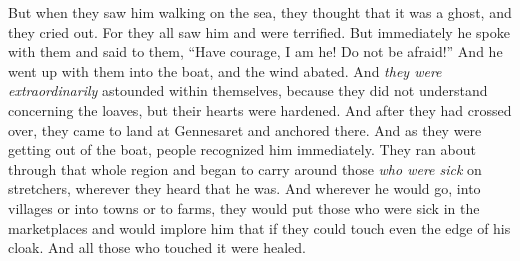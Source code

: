 \begin{biblechapter}
\verse But when they saw him walking on the sea, they thought that it was a ghost, and they cried out.
\verse For they all saw him and were terrified. But immediately he spoke with them and said to them, “Have courage, I am he! Do not be afraid!”
\verse And he went up with them into the boat, and the wind abated. And \textit{they were extraordinarily} astounded within themselves,
\verse because they did not understand concerning the loaves, but their hearts were hardened.
 And after they had crossed over, they came to land at Gennesaret and anchored there.
\verse And as they were getting out of the boat, people recognized him immediately.
\verse They ran about through that whole region and began to carry around those \textit{who were sick} on stretchers, wherever they heard that he was.
\verse And wherever he would go, into villages or into towns or to farms, they would put those who were sick in the marketplaces and would implore him that if they could touch even the edge of his cloak. And all those who touched it were healed.
\end{biblechapter}

